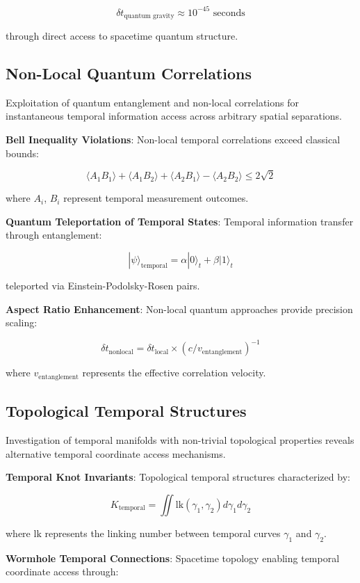 \documentclass[11pt]{article}
\theoremstyle{remark}
\begin{document}
$$\delta t_{\text{quantum gravity}} \approx 10^{-45} \text{ seconds}$$

through direct access to spacetime quantum structure.

\subsection{Non-Local Quantum Correlations}

Exploitation of quantum entanglement and non-local correlations for instantaneous temporal information access across arbitrary spatial separations.

\textbf{Bell Inequality Violations}: Non-local temporal correlations exceed classical bounds:

$$\langle A_1 B_1 \rangle + \langle A_1 B_2 \rangle + \langle A_2 B_1 \rangle - \langle A_2 B_2 \rangle \leq 2\sqrt{2}$$

where $A_i$, $B_i$ represent temporal measurement outcomes.

\textbf{Quantum Teleportation of Temporal States}: Temporal information transfer through entanglement:

$$|\psi\rangle_{\text{temporal}} = \alpha|0\rangle_t + \beta|1\rangle_t$$

teleported via Einstein-Podolsky-Rosen pairs.

\textbf{Aspect Ratio Enhancement}: Non-local quantum approaches provide precision scaling:

$$\delta t_{\text{nonlocal}} = \delta t_{\text{local}} \times (c/v_{\text{entanglement}})^{-1}$$

where $v_{\text{entanglement}}$ represents the effective correlation velocity.

\subsection{Topological Temporal Structures}

Investigation of temporal manifolds with non-trivial topological properties reveals alternative temporal coordinate access mechanisms.

\textbf{Temporal Knot Invariants}: Topological temporal structures characterized by:

$$K_{\text{temporal}} = \iint \text{lk}(\gamma_1,\gamma_2) d\gamma_1 d\gamma_2$$

where $\text{lk}$ represents the linking number between temporal curves $\gamma_1$ and $\gamma_2$.

\textbf{Wormhole Temporal Connections}: Spacetime topology enabling temporal coordinate access through:
\end{document}
